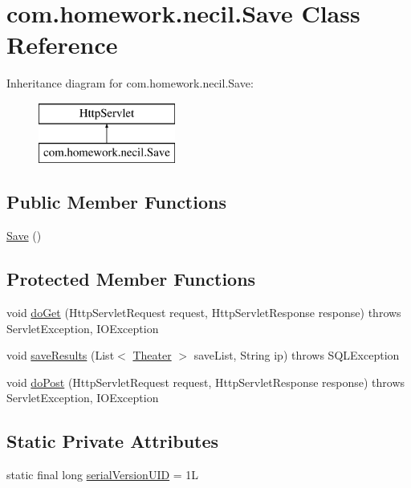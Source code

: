 \hypertarget{classcom_1_1homework_1_1necil_1_1_save}{}\section{com.\+homework.\+necil.\+Save Class Reference}
\label{classcom_1_1homework_1_1necil_1_1_save}
Inheritance diagram for com.\+homework.\+necil.\+Save\+:\begin{figure}[H]
\begin{center}
\leavevmode
\includegraphics[height=2.000000cm]{classcom_1_1homework_1_1necil_1_1_save}
\end{center}
\end{figure}
\subsection*{Public Member Functions}
\begin{DoxyCompactItemize}
\item 
\hyperlink{classcom_1_1homework_1_1necil_1_1_save_af1a4c33e128e9f17724e0d8fc9e53cb8}{Save} ()
\end{DoxyCompactItemize}
\subsection*{Protected Member Functions}
\begin{DoxyCompactItemize}
\item 
void \hyperlink{classcom_1_1homework_1_1necil_1_1_save_a17b47cfcae61b8b7d37e68bebe2d4722}{do\+Get} (Http\+Servlet\+Request request, Http\+Servlet\+Response response)  throws Servlet\+Exception, I\+O\+Exception 
\item 
void \hyperlink{classcom_1_1homework_1_1necil_1_1_save_a9849fea793232da63536c224c33cb224}{save\+Results} (List$<$ \hyperlink{classcom_1_1homework_1_1necil_1_1_theater}{Theater} $>$ save\+List, String ip)  throws S\+Q\+L\+Exception
\item 
void \hyperlink{classcom_1_1homework_1_1necil_1_1_save_aaa7d8afb8753fe29e2d0f309b6786b0a}{do\+Post} (Http\+Servlet\+Request request, Http\+Servlet\+Response response)  throws Servlet\+Exception, I\+O\+Exception 
\end{DoxyCompactItemize}
\subsection*{Static Private Attributes}
\begin{DoxyCompactItemize}
\item 
static final long \hyperlink{classcom_1_1homework_1_1necil_1_1_save_a119bae6e5d7806d885bc422930468430}{serial\+Version\+U\+ID} = 1L
\end{DoxyCompactItemize}



